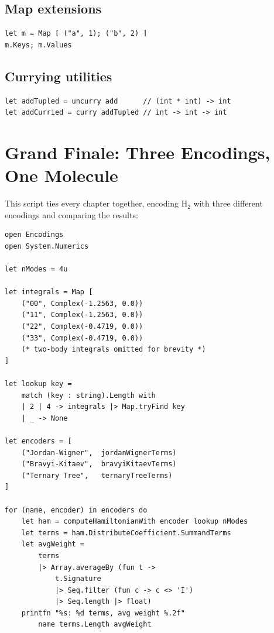 \documentclass[10pt,a4paper]{article}
\begin{document}
\subsection{Map extensions}

\begin{lstlisting}
let m = Map [ ("a", 1); ("b", 2) ]
m.Keys; m.Values
\end{lstlisting}

\subsection{Currying utilities}

\begin{lstlisting}
let addTupled = uncurry add      // (int * int) -> int
let addCurried = curry addTupled // int -> int -> int
\end{lstlisting}


\section{Grand Finale: Three Encodings, One Molecule}\label{ch:finale}

This script ties every chapter together, encoding H$_2$ with three
different encodings and comparing the results:

\begin{lstlisting}
open Encodings
open System.Numerics

let nModes = 4u

let integrals = Map [
    ("00", Complex(-1.2563, 0.0))
    ("11", Complex(-1.2563, 0.0))
    ("22", Complex(-0.4719, 0.0))
    ("33", Complex(-0.4719, 0.0))
    (* two-body integrals omitted for brevity *)
]

let lookup key =
    match (key : string).Length with
    | 2 | 4 -> integrals |> Map.tryFind key
    | _ -> None

let encoders = [
    ("Jordan-Wigner",  jordanWignerTerms)
    ("Bravyi-Kitaev",  bravyiKitaevTerms)
    ("Ternary Tree",   ternaryTreeTerms)
]

for (name, encoder) in encoders do
    let ham = computeHamiltonianWith encoder lookup nModes
    let terms = ham.DistributeCoefficient.SummandTerms
    let avgWeight =
        terms
        |> Array.averageBy (fun t ->
            t.Signature
            |> Seq.filter (fun c -> c <> 'I')
            |> Seq.length |> float)
    printfn "%s: %d terms, avg weight %.2f"
        name terms.Length avgWeight
\end{lstlisting}
\end{document}
